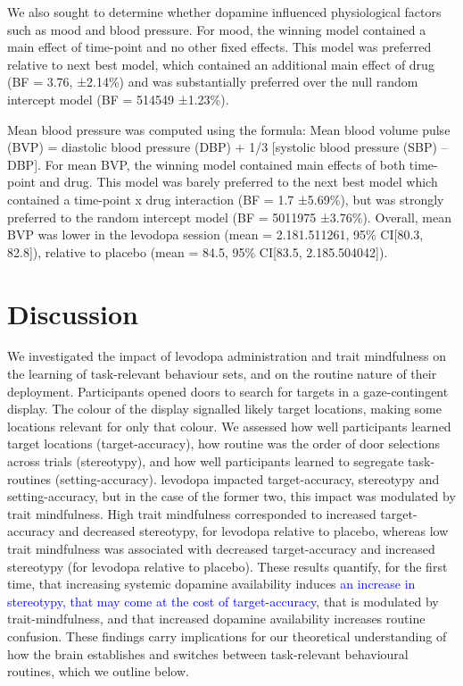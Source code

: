 \documentclass[
  man]{apa6}
\begin{document}
We also sought to determine whether dopamine influenced physiological factors such as mood and blood pressure. For mood, the winning model contained a main effect of time-point and no other fixed effects. This model was preferred relative to next best model, which contained an additional main effect of drug (BF = 3.76, ±2.14\%) and was substantially preferred over the null random intercept model (BF = 514549 ±1.23\%).

Mean blood pressure was computed using the formula: Mean blood volume pulse (BVP) = diastolic blood pressure (DBP) + 1/3 {[}systolic blood pressure (SBP) -- DBP{]}. For mean BVP, the winning model contained main effects of both time-point and drug. This model was barely preferred to the next best model which contained a time-point x drug interaction (BF = 1.7 ±5.69\%), but was strongly preferred to the random intercept model (BF = 5011975 ±3.76\%). Overall, mean BVP was lower in the levodopa session (mean = 2.181.511261, 95\% CI{[}80.3, 82.8{]}), relative to placebo (mean = 84.5, 95\% CI{[}83.5, 2.185.504042{]}).

\hypertarget{discussion}{%
\section{Discussion}\label{discussion}}

\label{sec:Discussion}

We investigated the impact of levodopa administration and trait mindfulness on the learning of task-relevant behaviour sets, and on the routine nature of their deployment. Participants opened doors to search for targets in a gaze-contingent display. The colour of the display signalled likely target locations, making some locations relevant for only that colour. We assessed how well participants learned target locations (target-accuracy), how routine was the order of door selections across trials (stereotypy), and how well participants learned to segregate task-routines (setting-accuracy). levodopa impacted target-accuracy, stereotypy and setting-accuracy, but in the case of the former two, this impact was modulated by trait mindfulness. High trait mindfulness corresponded to increased target-accuracy and decreased stereotypy, for levodopa relative to placebo, whereas low trait mindfulness was associated with decreased target-accuracy and increased stereotypy (for levodopa relative to placebo). These results quantify, for the first time, that increasing systemic dopamine availability induces \textcolor{blue}{an increase in stereotypy, that may come at the cost of target-accuracy}, that is modulated by trait-mindfulness, and that increased dopamine availability increases routine confusion. These findings carry implications for our theoretical understanding of how the brain establishes and switches between task-relevant behavioural routines, which we outline below.
\end{document}
